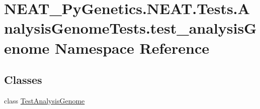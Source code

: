 \hypertarget{namespaceNEAT__PyGenetics_1_1NEAT_1_1Tests_1_1AnalysisGenomeTests_1_1test__analysisGenome}{}\section{N\+E\+A\+T\+\_\+\+Py\+Genetics.\+N\+E\+A\+T.\+Tests.\+Analysis\+Genome\+Tests.\+test\+\_\+analysis\+Genome Namespace Reference}
\label{namespaceNEAT__PyGenetics_1_1NEAT_1_1Tests_1_1AnalysisGenomeTests_1_1test__analysisGenome}
\subsection*{Classes}
\begin{DoxyCompactItemize}
\item 
class \hyperlink{classNEAT__PyGenetics_1_1NEAT_1_1Tests_1_1AnalysisGenomeTests_1_1test__analysisGenome_1_1TestAnalysisGenome}{Test\+Analysis\+Genome}
\end{DoxyCompactItemize}
